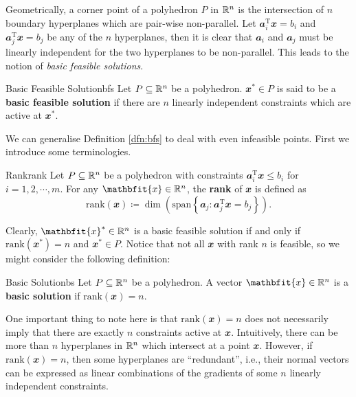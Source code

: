 \documentclass[math, code]{amznotes}
\theoremstyle{remark}
\begin{document}
Geometrically, a corner point of a polyhedron $P$ in $\mathbb{R}^n$ is the intersection of $n$ boundary hyperplanes which are pair-wise non-parallel. Let $\mathbfit{a}_i^{\mathrm{T}}\mathbfit{x} = b_i$ and $\mathbfit{a}_j^{\mathrm{T}}\mathbfit{x} = b_j$ be any of the $n$ hyperplanes, then it is clear that $\mathbfit{a}_i$ and $\mathbfit{a}_j$ must be linearly independent for the two hyperplanes to be non-parallel. This leads to the notion of \textit{basic feasible solutions}.
\begin{dfnbox}{Basic Feasible Solution}{bfs}
    Let $P \subseteq \mathbb{R}^n$ be a polyhedron. $\mathbfit{x}^* \in P$ is said to be a {\color{red} \textbf{basic feasible solution}} if there are $n$ linearly independent constraints which are active at $\mathbfit{x}^*$.
\end{dfnbox}
We can generalise Definition \ref{dfn:bfs} to deal with even infeasible points. First we introduce some terminologies.
\begin{dfnbox}{Rank}{rank}
    Let $P \subseteq \mathbb{R}^n$ be a polyhedron with constraints $\mathbfit{a}_i^{\mathrm{T}}\mathbfit{x} \leq b_i$ for $i = 1, 2, \cdots, m$. For any $\mathbfit{x} \in \R^n$, the {\color{red} \textbf{rank}} of $\mathbfit{x}$ is defined as 
    \begin{equation*}
        \mathrm{rank}(\mathbfit{x}) \coloneqq \dim\left(\mathrm{span}\left\{\mathbfit{a}_j \colon \mathbfit{a}_j^{\mathrm{T}}\mathbfit{x} = b_j\right\}\right).
    \end{equation*}
\end{dfnbox}
Clearly, $\mathbfit{x}^* \in \R^n$ is a basic feasible solution if and only if $\mathrm{rank}(\mathbfit{x}^*) = n$ and $\mathbfit{x}^* \in P$. Notice that not all $\mathbfit{x}$ with rank $n$ is feasible, so we might consider the following definition:
\begin{dfnbox}{Basic Solution}{bs}
    Let $P \subseteq \mathbb{R}^n$ be a polyhedron. A vector $\mathbfit{x} \in \R^n$ is a {\color{red} \textbf{basic solution}} if $\mathrm{rank}(\mathbfit{x}) = n$.
\end{dfnbox}
One important thing to note here is that $\mathrm{rank}(\mathbfit{x}) = n$ does not necessarily imply that there are exactly $n$ constraints active at $\mathbfit{x}$. Intuitively, there can be more than $n$ hyperplanes in $\mathbb{R}^n$ which intersect at a point $\mathbfit{x}$. However, if $\mathrm{rank}(\mathbfit{x}) = n$, then some hyperplanes are ``redundant'', i.e., their normal vectors can be expressed as linear combinations of the gradients of some $n$ linearly independent constraints.
\end{document}
